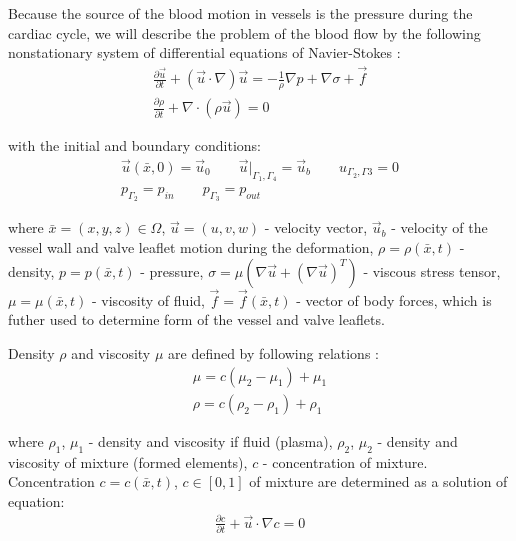 \documentclass[runningheads,a4paper]{llncs}
\begin{document}
Because the source of the blood motion in vessels is the pressure during the cardiac cycle, we will describe the problem of the blood flow
by the following nonstationary system of differential equations of Navier-Stokes \cite{gummel}:
\begin{gather}
    \label{eq:navier_stokes:motion}
    \frac{\partial \vec{u}}{\partial t} + (\vec{u} \cdot \nabla) \vec{u} = - \frac{1}{\rho} \nabla p + \nabla \sigma + \vec{f}\\
    \label{eq:navier_stokes:continuity}
    \frac{\partial \rho}{\partial t} + \nabla \cdot (\rho \vec{u}) = 0 
\end{gather}

with the initial and boundary conditions:
\begin{gather}
    \label{eq:navier_stokes:velocity_conditions}
    \vec{u}(\bar{x}, 0) = \vec{u}_0 \qquad \vec{u}|_{\Gamma_1, \Gamma_4} = \vec{u}_b \qquad u_{\Gamma_2, \Gamma3} = 0\\
    \label{eq:navier_stokes:pressure_conditions}
    p_{\Gamma_2} = p_{in} \qquad p_{\Gamma_3} = p_{out}
\end{gather}

where $\bar{x}=(x,y,z) \in \Omega$, $\vec{u}=(u,v,w)$ - velocity vector, $\vec{u}_b$ - velocity of the vessel wall and valve leaflet motion during the deformation,
$\rho=\rho(\bar{x}, t)$ - density, $p=p(\bar{x}, t)$ - pressure, $\sigma = \mu (\nabla \vec{u} + (\nabla \vec{u})^T)$ - viscous stress tensor,
$\mu = \mu(\bar{x}, t)$ - viscosity of fluid, $\vec{f} = \vec{f}(\bar{x}, t)$ - vector of body forces, which is futher used to determine form of the vessel and valve leaflets. 

Density $\rho$ and viscosity $\mu$ are defined by following relations \cite{gummel}:
\begin{gather}
    \label{eq:viscosity}
    \mu = c (\mu_2 - \mu_1) + \mu_1\\
    \label{eq:density}
    \rho = c (\rho_2 - \rho_1) + \rho_1
\end{gather}

where $\rho_1$, $\mu_1$ - density and viscosity if fluid (plasma), $\rho_2$, $\mu_2$ - density and viscosity of mixture (formed elements), $c$ - concentration of mixture. Concentration $c=c(\bar{x}, t)$, $c \in [0, 1]$ of mixture are determined as a solution of equation:
\begin{gather}
    \label{eq:convection}
    \frac{\partial c}{\partial t} + \vec{u} \cdot \nabla c = 0
\end{gather}
\end{document}

